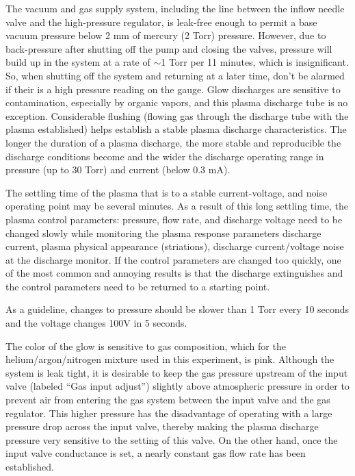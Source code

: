 \documentclass{../lab}
\begin{document}
The vacuum and gas supply system, including the line between the inflow needle valve and the high-pressure regulator, is leak-free enough to permit a base vacuum pressure below 2 mm of mercury (2 Torr) pressure. However, due to back-pressure after shutting off the pump and closing the valves, pressure will build up in the system at a rate of $\sim$1 Torr per 11 minutes, which is insignificant. So, when shutting off the system and returning at a later time, don't be alarmed if their is a high pressure reading on the gauge. Glow discharges are sensitive to contamination, especially by organic vapors, and this plasma discharge tube is no exception. Considerable flushing (flowing gas through the discharge tube with the plasma established) helps establish a stable plasma discharge characteristics. The longer the duration of a plasma discharge, the more stable and reproducible the discharge conditions become and the wider the discharge operating range in pressure (up to 30 Torr) and current (below 0.3 mA).

The settling time of the plasma that is to a stable current-voltage, and noise operating point may be several minutes. As a result of this long settling time, the plasma control parameters: pressure, flow rate, and discharge voltage need to be changed slowly while monitoring the plasma response parameters discharge current, plasma physical appearance (striations), discharge current/voltage noise at the discharge monitor. If the control parameters are changed too quickly, one of the most common and annoying results is that the discharge extinguishes and the control parameters need to be returned to a starting point.

As a guideline, changes to pressure should be slower than 1 Torr every 10 seconds and the voltage changes 100V in 5 seconds.

The color of the glow is sensitive to gas composition, which for the helium/argon/nitrogen mixture used in this experiment, is pink. Although the system is leak tight, it is desirable to keep the gas pressure upstream of the input valve (labeled ``Gas input adjust'') slightly above atmospheric pressure in order to prevent air from entering the gas system between the input valve and the gas regulator. This higher pressure has the disadvantage of operating with a large pressure drop across the input valve, thereby making the plasma discharge pressure very sensitive to the setting of this valve. On the other hand, once the input valve conductance is set, a nearly constant gas flow rate has been established.
\end{document}
